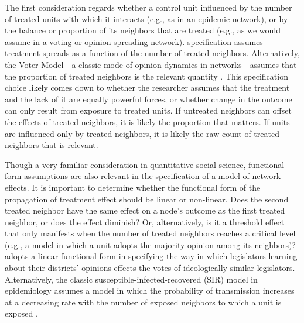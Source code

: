 \documentclass[12pt]{article}
\begin{document}
\begin{itemize}
The first consideration regards whether a control unit influenced by the number of treated units with which it interacts (e.g., as in an epidemic network), or by the balance or proportion of its neighbors that are treated (e.g., as we would assume in a voting or opinion-spreading network). \citet{bowers2012reasoning} specification assumes treatment spreads as a function of the number of treated neighbors. Alternatively, the Voter Model---a classic mode of opinion dynamics in networks---assumes that the proportion of treated neighbors is the relevant quantity \citep{valentini2014self}. This specification choice likely comes down to whether the researcher assumes that the treatment and the lack of it are equally powerful forces, or whether change in the outcome can only result from exposure to treated units. If untreated neighbors can offset the effects of treated neighbors, it is likely the proportion that matters. If units are influenced only by treated neighbors, it is likely the raw count of treated neighbors that is relevant. 

Though a very familiar consideration in quantitative social science, functional form assumptions are also relevant in the specification of a model of network effects. It is important to determine whether the functional form of the propagation of treatment effect should be linear or non-linear. Does the second treated neighbor have the same effect on a node's outcome as the first treated neighbor, or does the effect diminish? Or, alternatively, is it a threshold effect that only manifests when the number of treated neighbors reaches a critical level (e.g., a model in which a unit adopts the majority opinion among its neighbors)? \citet{coppock2014information} adopts a linear functional form in specifying the way in which legislators learning about their districts' opinions effects the votes of ideologically similar legislators. Alternatively, the classic susceptible-infected-recovered (SIR) model in epidemiology assumes a model in which the probability of transmission increases at a decreasing rate with the number of exposed neighbors to which a unit is exposed \citep{dodds2004universal}.

\end{itemize}

\end{document}
